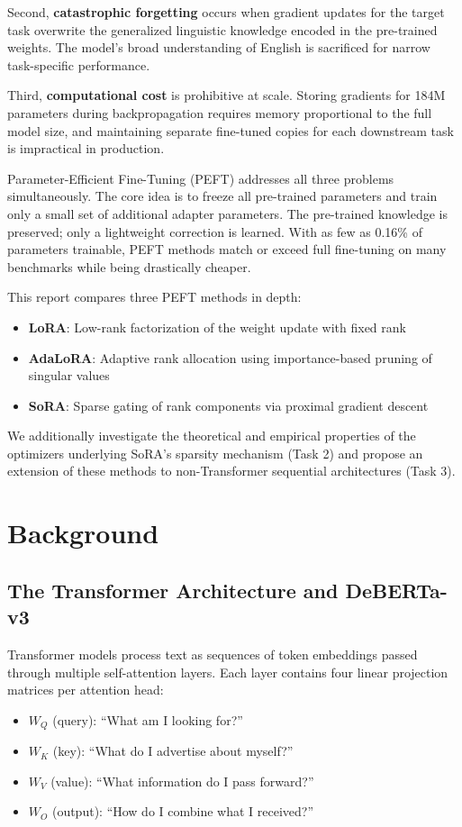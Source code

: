 \documentclass[12pt,a4paper]{article}
\theoremstyle{definition}
\begin{document}
Second, \textbf{catastrophic forgetting} occurs when gradient updates for the target task overwrite the generalized linguistic knowledge encoded in the pre-trained weights. The model's broad understanding of English is sacrificed for narrow task-specific performance.

Third, \textbf{computational cost} is prohibitive at scale. Storing gradients for 184M parameters during backpropagation requires memory proportional to the full model size, and maintaining separate fine-tuned copies for each downstream task is impractical in production.

Parameter-Efficient Fine-Tuning (PEFT) addresses all three problems simultaneously. The core idea is to freeze all pre-trained parameters and train only a small set of additional adapter parameters. The pre-trained knowledge is preserved; only a lightweight correction is learned. With as few as 0.16\% of parameters trainable, PEFT methods match or exceed full fine-tuning on many benchmarks while being drastically cheaper.

This report compares three PEFT methods in depth:
\begin{itemize}
    \item \textbf{LoRA}: Low-rank factorization of the weight update with fixed rank
    \item \textbf{AdaLoRA}: Adaptive rank allocation using importance-based pruning of singular values
    \item \textbf{SoRA}: Sparse gating of rank components via proximal gradient descent
\end{itemize}

We additionally investigate the theoretical and empirical properties of the optimizers underlying SoRA's sparsity mechanism (Task 2) and propose an extension of these methods to non-Transformer sequential architectures (Task 3).

\section{Background}

\subsection{The Transformer Architecture and DeBERTa-v3}

Transformer models process text as sequences of token embeddings passed through multiple self-attention layers. Each layer contains four linear projection matrices per attention head:
\begin{itemize}
    \item $W_Q$ (query): ``What am I looking for?''
    \item $W_K$ (key): ``What do I advertise about myself?''
    \item $W_V$ (value): ``What information do I pass forward?''
    \item $W_O$ (output): ``How do I combine what I received?''
\end{itemize}
\end{document}
